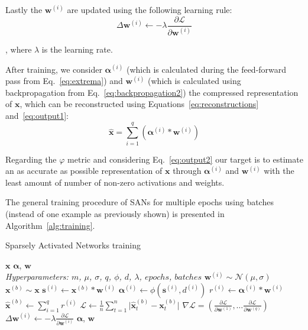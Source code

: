 \documentclass[journal]{IEEEtran}
\begin{document}
Lastly the $\bm{w}^{(i)}$ are updated using the following learning rule:
\begin{equation}
	\label{eq:backpropagation2}
	\Delta\bm{w}^{(i)} \leftarrow -\lambda\frac{\partial\mathcal{L}}{\partial\bm{w}^{(i)}}
\end{equation}

\noindent
, where $\lambda$ is the learning rate.

After training, we consider $\bm{\alpha}^{(i)}$ (which is calculated during the feed-forward pass from Eq.~\ref{eq:extrema}) and $\bm{w}^{(i)}$ (which is calculated using backpropagation from Eq.~\ref{eq:backpropagation2}) the compressed representation of $\bm{x}$, which can be reconstructed using Equations~\ref{eq:reconstructions} and~\ref{eq:output1}:
\begin{equation}
	\label{eq:output2}
	\hat{\bm{x}} = \sum\limits_{i=1}^q \left(\bm{\alpha}^{(i)} * \bm{w}^{(i)}\right)
\end{equation}

Regarding the $\varphi$ metric and considering Eq.~\ref{eq:output2} our target is to estimate an as accurate as possible representation of $\bm{x}$ through $\bm{\alpha}^{(i)}$ and $\bm{w}^{(i)}$ with the least amount of number of non-zero activations and weights.

The general training procedure of SANs for multiple epochs using batches (instead of one example as previously shown) is presented in Algorithm~\ref{alg:training}.

\begin{algorithm}[H]
	\caption{Sparsely Activated Networks training}
	\label{alg:training}
	\begin{algorithmic}[1]
		\renewcommand{\algorithmicrequire}{\textbf{Input:}}
		\renewcommand{\algorithmicensure}{\textbf{Output:}}
		\REQUIRE $\bm{x}$
		\ENSURE $\bm{\alpha}$, $\bm{w}$
		\\ \textit{Hyperparameters:  $m$, $\mu$, $\sigma$, $q$, $\phi$, $d$, $\lambda$, $epochs$, $batches$}
		\STATE $\bm{w}^{(i)} \sim \mathcal{N}(\mu, \sigma)$
		\ENDFOR
		\STATE $\bm{x}^{(b)} \sim \bm{x}$
		\STATE $\bm{s}^{(i)} \leftarrow \bm{x}^{(b)} * \bm{w}^{(i)}$
		\STATE $\bm{\alpha}^{(i)} \leftarrow \phi(\bm{s}^{(i)}, d^{(i)})$
		\STATE $r^{(i)} \leftarrow \bm{\alpha}^{(i)} * \bm{w}^{(i)}$
		\ENDFOR
		\STATE $\hat{\bm{x}}^{(b)} \leftarrow \sum\limits_{i=1}^q r^{(i)}$
		\STATE $\mathcal{L} \leftarrow \frac{1}{n}\sum\limits_{t=1}^n \lvert\hat{\bm{x}}^{(b)}_t - \bm{x}^{(b)}_t \rvert$
		\STATE $\nabla\mathcal{L} = \left( \frac{\partial\mathcal{L}}{\partial\bm{w}^{(1)}},\ldots\frac{\partial\mathcal{L}}{\partial\bm{w}^{(q)}}\right)$
		\STATE $\Delta\bm{w}^{(i)} \leftarrow -\lambda\frac{\partial\mathcal{L}}{\partial\bm{w}^{(i)}}$
		\ENDFOR
		\ENDFOR
		\RETURN $\bm{\alpha}$, $\bm{w}$
	\end{algorithmic}
\end{algorithm}
\end{document}
